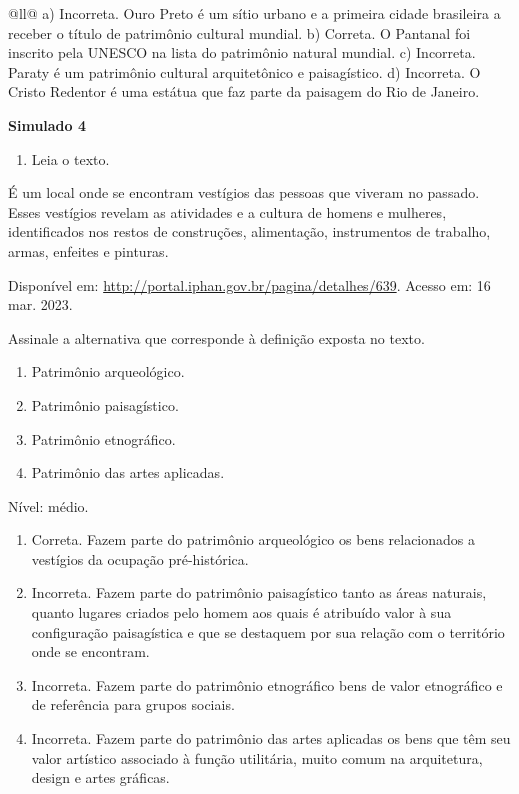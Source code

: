 \begin{itemize}
\begin{itemize}
\begin{escolha}[]{@{}ll@{}}
{a) Incorreta. Ouro Preto é um sítio urbano e a primeira cidade brasileira
  a receber o título de patrimônio cultural mundial.
b) Correta. O Pantanal foi inscrito pela UNESCO na lista do patrimônio
  natural mundial.
c) Incorreta. Paraty é um patrimônio cultural arquitetônico e
  paisagístico.
d) Incorreta. O Cristo Redentor é uma estátua que faz parte da paisagem
  do Rio de Janeiro.}


\textbf{Simulado 4}

\begin{enumerate}
\def\labelenumi{\arabic{enumi}.}
\item
  Leia o texto.
\end{enumerate}

É um local onde se encontram vestígios das pessoas que viveram no
passado. Esses vestígios revelam as atividades e a cultura de homens e
mulheres, identificados nos restos de construções, alimentação,
instrumentos de trabalho, armas, enfeites e pinturas.~

Disponível em: \url{http://portal.iphan.gov.br/pagina/detalhes/639}.
Acesso em: 16 mar. 2023.

Assinale a alternativa que corresponde à definição exposta no texto.

\begin{enumerate}
\def\labelenumi{\alph{enumi}.}
\item
  Patrimônio arqueológico.
\item
  Patrimônio paisagístico.
\item
  Patrimônio etnográfico.
\item
  Patrimônio das artes aplicadas.
\end{enumerate}

Nível: médio.

\begin{enumerate}
\def\labelenumi{\alph{enumi}.}
\item
  Correta. Fazem parte do patrimônio arqueológico os bens relacionados a
  vestígios da ocupação pré-histórica.
\item
  Incorreta. Fazem parte do patrimônio paisagístico tanto as áreas
  naturais, quanto lugares criados pelo homem aos quais é atribuído
  valor à sua configuração paisagística e que se destaquem por sua
  relação com o território onde se encontram.
\item
  Incorreta. Fazem parte do patrimônio etnográfico bens de valor
  etnográfico e de referência para grupos sociais.
\item
  Incorreta. Fazem parte do patrimônio das artes aplicadas os bens que
  têm seu valor artístico associado à função utilitária, muito comum na
  arquitetura, design e artes gráficas.
\end{enumerate}


\end{escolha}
\end{itemize}
\end{itemize}
